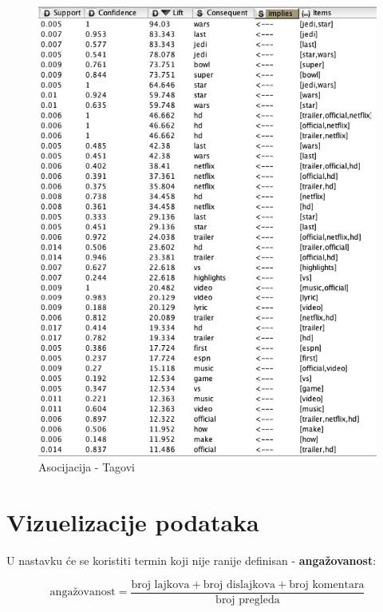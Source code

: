 \documentclass[a4paper]{article}
\theoremstyle{definition}
\begin{document}
\begin{figure}[H]
\begin{center}
    \includegraphics[width=1\textwidth]{association2.png}
    \caption{Asocijacija - Tagovi}
     \label{fig:asoc2}
\end{center}
\end{figure}


\section{Vizuelizacije podataka}
\label{sec:dod}

U nastavku će se koristiti termin koji nije ranije definisan - \textbf{angažovanost}:
\newline

$$\text{angažovanost} = \frac{\text{broj lajkova} + \text{broj dislajkova} + \text{broj komentara}}{\text{broj pregleda}}$$
\end{document}
